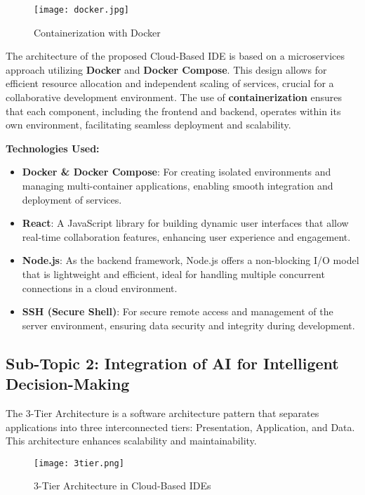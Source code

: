 \documentclass[12pt,a4paper,final]{report}
\begin{document}
\begin{figure}[h] %
    \centering
    \texttt{[image: docker.jpg]} %
    \caption{Containerization with Docker}
    \label{fig:docker}
\end{figure}


The architecture of the proposed Cloud-Based IDE is based on a microservices approach utilizing \textbf{Docker} and \textbf{Docker Compose}. This design allows for efficient resource allocation and independent scaling of services, crucial for a collaborative development environment. The use of \textbf{containerization} ensures that each component, including the frontend and backend, operates within its own environment, facilitating seamless deployment and scalability.

\textbf{Technologies Used:}
\begin{itemize}
    \item \textbf{Docker \& Docker Compose}: For creating isolated environments and managing multi-container applications, enabling smooth integration and deployment of services.
    \item \textbf{React}: A JavaScript library for building dynamic user interfaces that allow real-time collaboration features, enhancing user experience and engagement.
    \item \textbf{Node.js}: As the backend framework, Node.js offers a non-blocking I/O model that is lightweight and efficient, ideal for handling multiple concurrent connections in a cloud environment.
    \item \textbf{SSH (Secure Shell)}: For secure remote access and management of the server environment, ensuring data security and integrity during development.
\end{itemize}

\subsection{Sub-Topic 2: Integration of AI for Intelligent Decision-Making}


\hspace{1cm}
The 3-Tier Architecture is a software architecture pattern that separates applications into three interconnected tiers: Presentation, Application, and Data. This architecture enhances scalability and maintainability.

\begin{figure}[h] %
    \centering
    \texttt{[image: 3tier.png]} %
    \caption{3-Tier Architecture in Cloud-Based IDEs}
    \label{fig:3tier}
\end{figure}
\end{document}
